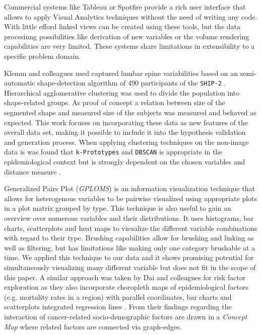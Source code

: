 \documentclass[journal]{style/vgtc}           %
\begin{document}
Commercial systems like Tableau or Spotfire provide a rich user interface that allows to apply Visual Analytics techniques without the need of writing any code.
%
With little efford linked views can be created using these tools, but the data procesinng possibilities like derivation of new variables or the volume rendering capabilities are very limited.
%
These systems share limitations in extensibility to a specific problem domain.

Klemm and colleagues used captured lumbar spine variabilities based on an semi-automatic shape-detection algorithm of 490 participants of the \texttt{SHIP-2} \cite{Klemm2013VMV}.
%
Hierarchical agglomerative clustering was used to divide the population into shape-related groups.
%
As proof of concept a relation between size of the segmented shape and measured size of the subjects was measured and behaved as expected.
%
This work focuses on incorporating these data as new features of the overall data set, making it possible to include it into the hypothesis validation and generation process.
%
When applying clustering techniques on the non-image data is was found that \texttt{k-Prototypes} and \texttt{DBSCAN} is appropriate in the epidemiological context but is strongly dependent on the chosen variables and distance measure \cite{Klemm2014BVM}.

Generalized Pairs Plot (\emph{GPLOMS}) is an information visualization technique that allows for heterogenous variables to be pairwise visualized using appropriate plots in a plot matrix grouped by type.
%
This technique is also useful to gain an overview over numerous variables and their distributions.
%
It uses histograms, bar charts, scatterplots and heat maps to visualize the different variable combinations with regard to their type.
%
Brushing capabilities allow for brushing and linking as well as filtering, but has limitations like making only one category brushable at a time.
%
We applied this technique to our data and it shows promising potential for simultaneously visualizing many different variable but does not fit in the scope of this paper.
%
A similar approach was taken by Dai and colleagues for risk factor exploration as they also incorporate choropleth maps of epidemiological factors (e.g. mortality rates in a region) with parallel coordinates, bar charts and scatterplots integrated regression lines \cite{Dai2005}.
%
From their findings regarding the interaction of cancer-related socio-demographic factors are drawn in a \emph{Concept Map} where related factors are connected via graph-edges.
\end{document}
